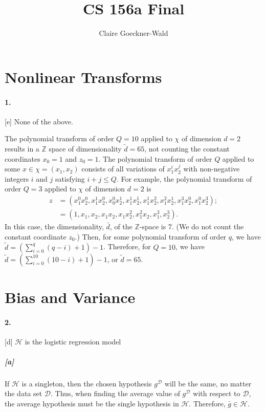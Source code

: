 \documentclass[titlepage]{article}
\begin{document}
\title{CS 156a Final}
\author{Claire Goeckner-Wald}
\maketitle 

\section*{Nonlinear Transforms}
\paragraph{1.} [e] None of the above.
	
	The polynomial transform of order $Q = 10$ applied to $\chi$ of dimension $d=2$ results in a $\mathbb Z$ space of dimensionality $\tilde d = 65$, not counting the constant coordinates $x_0 = 1$ and $z_0 = 1$. The polynomial transform of order $Q$ applied to some $x \in \chi = (x_1, x_2)$ consists of all variations of $x_1^ix_2^j$ with non-negative integers $i$ and $j$ satisfying $i+j \leq Q$. For example, the polynomial transform of order $Q = 3$ applied to $\chi$ of dimension $d=2$ is 
	\begin{align*}
	z &= (x_1^0x_2^0, x_1^1x_2^0, x_0^0x_2^1, x_1^1x_2^1, x_1^1x_2^2, x_1^2x_2^1, x_1^3x_2^0, x_1^0x_2^3); \\
	&= (1, x_1, x_2, x_1x_2, x_1x_2^2, x_1^2x_2, x_1^3, x_2^3).
	\end{align*}
	In this case, the dimensionality, $\bar d$, of the $\mathbb Z$-space is 7. (We do not count the constant coordinate $z_0$.) Then, for some polynomial transform of order $q$, we have $\tilde d = (\sum_{i=0}^q (q - i) + 1)-1$. Therefore, for $Q=10$, we have $\tilde d = (\sum_{i=0}^{10} (10 - i) + 1)-1$, or $\tilde d = 65$.

\section*{Bias and Variance}
\paragraph{2.} [d] $\mathcal H$ is the logistic regression model

	\subparagraph{[a]} If $\mathcal H$ is a singleton, then the chosen hypothesis $g^{\mathcal D}$ will be the same, no matter the data set $\mathcal D$. Thus, when finding the average value of $g^{\mathcal D}$ with respect to $\mathcal D$, the average hypothesis must be the single hypothesis in $\mathcal H$. Therefore, $\bar g \in \mathcal H$.
\end{document}
